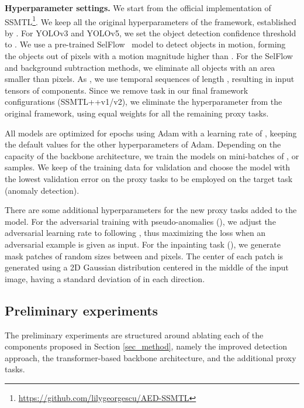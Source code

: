 \documentclass[times,twocolumn,final,authoryear]{elsarticle}
\begin{document}
\noindent
\textbf{Hyperparameter settings.}
We start from the official implementation of SSMTL\footnote{\url{https://github.com/lilygeorgescu/AED-SSMTL}}. We keep all the original hyperparameters of the framework, established by \cite{Georgescu-CVPR-2021}. For YOLOv3 and YOLOv5, we set the object detection confidence threshold to . We use a pre-trained SelFlow~\citep{Liu-CVPR-2019} model to detect objects in motion, forming the objects out of pixels with a motion magnitude higher than . For the SelFlow and background subtraction methods, we eliminate all objects with an area smaller than  pixels. As \cite{Georgescu-CVPR-2021}, we use temporal sequences of length , resulting in input tensors of  components. Since we remove task  in our final framework configurations (SSMTL++v1/v2), we eliminate the hyperparameter  from the original framework, using equal weights for all the remaining proxy tasks.

All models are optimized for  epochs using Adam \citep{Kingma-ICLR-2014} with a learning rate of , keeping the default values for the other hyperparameters of Adam. Depending on the capacity of the backbone architecture, we train the models on mini-batches of ,  or  samples. We keep  of the training data for validation and choose the model with the lowest validation error on the proxy tasks to be employed on the target task (anomaly detection).

There are some additional hyperparameters for the new proxy tasks added to the model. For the adversarial training with pseudo-anomalies (), we adjust the adversarial learning rate to  following \citep{McHardy-NAACL-2019}, thus maximizing the loss when an adversarial example is given as input. For the inpainting task (), we generate mask patches of random sizes between  and  pixels. The center of each patch is generated using a 2D Gaussian distribution centered in the middle of the input image, having a standard deviation of  in each direction.

\subsection{Preliminary experiments}
\label{sec_prelim}

The preliminary experiments are structured around ablating each of the components proposed in Section \ref{sec_method}, namely the improved detection approach, the transformer-based backbone architecture, and the additional proxy tasks.
\end{document}

